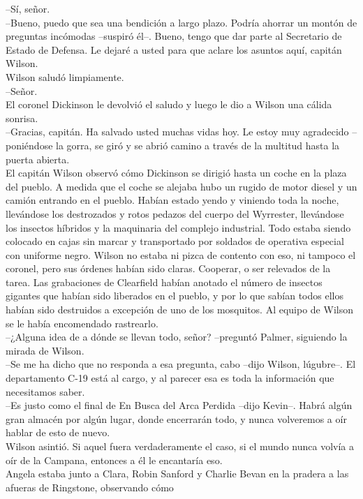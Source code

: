 --Sí, señor.\\
--Bueno, puedo que sea una bendición a largo plazo. Podría ahorrar un
montón de preguntas incómodas --suspiró él--. Bueno, tengo que dar parte
al Secretario de Estado de Defensa. Le dejaré a usted para que aclare
los asuntos aquí, capitán Wilson.\\
Wilson saludó limpiamente.\\
--Señor.\\
El coronel Dickinson le devolvió el saludo y luego le dio a Wilson una
cálida sonrisa.\\
--Gracias, capitán. Ha salvado usted muchas vidas hoy. Le estoy muy
agradecido --poniéndose la gorra, se giró y se abrió camino a través de
la multitud hasta la puerta abierta.\\
El capitán Wilson observó cómo Dickinson se dirigió hasta un coche en la
plaza del pueblo. A medida que el coche se alejaba hubo un rugido de
motor diesel y un camión entrando en el pueblo. Habían estado yendo y
viniendo toda la noche, llevándose los destrozados y rotos pedazos del
cuerpo del Wyrrester, llevándose los insectos híbridos y la maquinaria
del complejo industrial. Todo estaba siendo colocado en cajas sin marcar
y transportado por soldados de operativa especial con uniforme negro.
Wilson no estaba ni pizca de contento con eso, ni tampoco el coronel,
pero sus órdenes habían sido claras. Cooperar, o ser relevados de la
tarea. Las grabaciones de Clearfield habían anotado el número de
insectos gigantes que habían sido liberados en el pueblo, y por lo que
sabían todos ellos habían sido destruidos a excepción de uno de los
mosquitos. Al equipo de Wilson se le había encomendado rastrearlo.\\
--¿Alguna idea de a dónde se llevan todo, señor? --preguntó Palmer,
siguiendo la mirada de Wilson.\\
--Se me ha dicho que no responda a esa pregunta, cabo --dijo Wilson,
lúgubre--. El departamento C-19 está al cargo, y al parecer esa es toda
la información que necesitamos saber.\\
--Es justo como el final de En Busca del Arca Perdida --dijo Kevin--.
Habrá algún gran almacén por algún lugar, donde encerrarán todo, y nunca
volveremos a oír hablar de esto de nuevo.\\
Wilson asintió. Si aquel fuera verdaderamente el caso, si el mundo nunca
volvía a oír de la Campana, entonces a él le encantaría
eso.\\[2\baselineskip]Angela estaba junto a Clara, Robin Sanford y
Charlie Bevan en la pradera a las afueras de Ringstone, observando cómo
